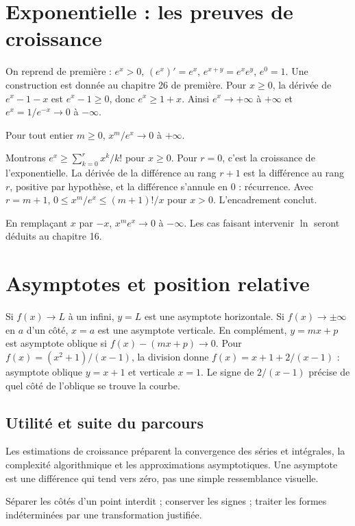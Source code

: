 \documentclass[../cours_tle.tex]{subfiles}
\begin{document}
\section{Exponentielle : les preuves de croissance}
On reprend de première : $e^x>0$, $(e^x)'=e^x$, $e^{x+y}=e^xe^y$, $e^0=1$. Une construction est donnée au chapitre 26 de première.
Pour $x\ge0$, la dérivée de $e^x-1-x$ est $e^x-1\ge0$, donc $e^x\ge1+x$. Ainsi $e^x\to+\infty$ à $+\infty$ et $e^x=1/e^{-x}\to0$ à $-\infty$.
\begin{theoreme}
Pour tout entier $m\ge0$, $x^m/e^x\to0$ à $+\infty$.
\end{theoreme}
\begin{demonstration}
Montrons $e^x\ge\sum_{k=0}^r x^k/k!$ pour $x\ge0$. Pour $r=0$, c'est la croissance de l'exponentielle. La dérivée de la différence au rang $r+1$ est la différence au rang $r$, positive par hypothèse, et la différence s'annule en $0$ : récurrence.
Avec $r=m+1$, $0\le x^m/e^x\le(m+1)!/x$ pour $x>0$. L'encadrement conclut.
\end{demonstration}
En remplaçant $x$ par $-x$, $x^me^x\to0$ à $-\infty$. Les cas faisant intervenir $\ln$ seront déduits au chapitre 16.
\section{Asymptotes et position relative}
Si $f(x)\to L$ à un infini, $y=L$ est une asymptote horizontale. Si $f(x)\to\pm\infty$ en $a$ d'un côté, $x=a$ est une asymptote verticale.
En complément, $y=mx+p$ est asymptote oblique si $f(x)-(mx+p)\to0$.
Pour $f(x)=(x^2+1)/(x-1)$, la division donne $f(x)=x+1+2/(x-1)$ : asymptote oblique $y=x+1$ et verticale $x=1$. Le signe de $2/(x-1)$ précise de quel côté de l'oblique se trouve la courbe.
\begin{finchapitre}
\section{Utilité et suite du parcours}
Les estimations de croissance préparent la convergence des séries et intégrales, la complexité algorithmique et les approximations asymptotiques. Une asymptote est une différence qui tend vers zéro, pas une simple ressemblance visuelle.
\begin{retenir}
Séparer les côtés d'un point interdit ; conserver les signes ; traiter les formes indéterminées par une transformation justifiée.
\end{retenir}
\end{finchapitre}
\end{document}
